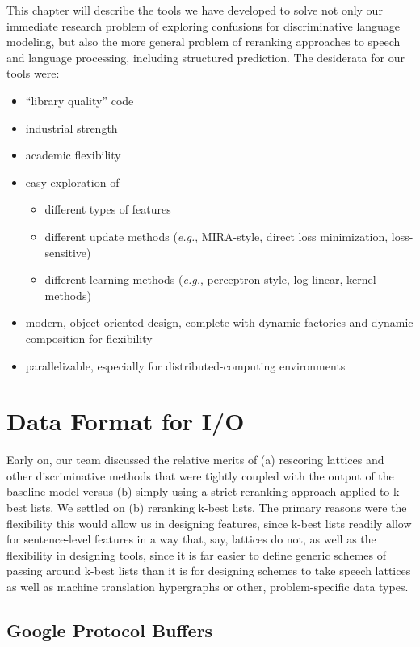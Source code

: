 \documentclass[a4paper]{article}
\begin{document}
This chapter will describe the tools we have developed
to solve not only our immediate research problem of exploring confusions
for discriminative language modeling, but also the more general problem
of reranking approaches to speech and language processing, including
structured prediction. The desiderata for our tools were:
\begin{itemize}
\item ``library quality'' code
\item industrial strength
\item academic flexibility
\item easy exploration of

\begin{itemize}
\item different types of features
\item different update methods (\emph{e.g.}, MIRA-style, direct loss minimization,
loss-sensitive)
\item different learning methods (\emph{e.g.}, perceptron-style, log-linear,
kernel methods)
\end{itemize}
\item modern, object-oriented design, complete with dynamic factories and
dynamic composition for flexibility
\item parallelizable, especially for distributed-computing environments
\end{itemize}
\section{Data Format for I/O}

Early on, our team discussed the relative merits of (a) rescoring
lattices and other discriminative methods that were tightly coupled
with the output of the baseline model versus (b) simply using a strict
reranking approach applied to k-best lists. We settled on (b) reranking
k-best lists. The primary reasons were the flexibility this would
allow us in designing features, since k-best lists readily allow for
sentence-level features in a way that, say, lattices do not, as well
as the flexibility in designing tools, since it is far easier to define
generic schemes of passing around k-best lists than it is for designing
schemes to take speech lattices as well as machine translation hypergraphs
or other, problem-specific data types.


\subsection{\label{sub:protobufs}Google Protocol Buffers}
\end{document}
